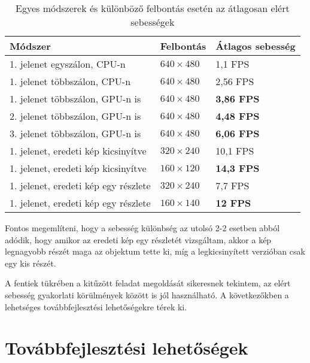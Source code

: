 \begin{table}[tbh]
\centering

\begin{tabular}{|l|l|l|}
\hline
\textbf{Módszer} & \textbf{Felbontás} & \textbf{Átlagos sebesség} \\ \hline\hline

1. jelenet egyszálon, CPU-n & $640\times 480$ & 1,1 FPS \\ \hline
1. jelenet többszálon, CPU-n & $640\times 480$ & 2,56 FPS \\ \hline
1. jelenet többszálon, GPU-n is & $640\times 480$ & \textbf{3,86 FPS} \\ \hline\hline
2. jelenet többszálon, GPU-n is & $640\times 480$ & \textbf{4,48 FPS} \\ \hline\hline
3. jelenet többszálon, GPU-n is & $640\times 480$ & \textbf{6,06 FPS} \\ \hline\hline

1. jelenet, eredeti kép kicsinyítve & $320\times 240$ & 10,1 FPS \\ \hline
1. jelenet, eredeti kép kicsinyítve & $160\times 120$ & \textbf{14,3 FPS} \\ \hline\hline

1. jelenet, eredeti kép egy részlete & $320\times 240$ & 7,7 FPS \\ \hline
1. jelenet, eredeti kép egy részlete & $160\times 140$ & \textbf{12 FPS} \\ \hline

\end{tabular}

\caption{Egyes módszerek és különböző felbontás esetén az átlagosan elért sebességek \label{table:results}}
\end{table}

Fontos megemlíteni, hogy a sebesség különbség az utolsó 2-2 esetben abból adódik, hogy amikor az eredeti kép egy részletét vizsgáltam, akkor a kép legnagyobb részét maga az objektum tette ki, míg a legkicsinyített verzióban csak egy kis részét.

A fentiek tükrében a kitűzött feladat megoldását sikeresnek tekintem, az elért sebesség gyakorlati körülmények között is jól használható. A következőkben a lehetséges továbbfejlesztési lehetőségekre térek ki.

\section{Továbbfejlesztési lehetőségek}

